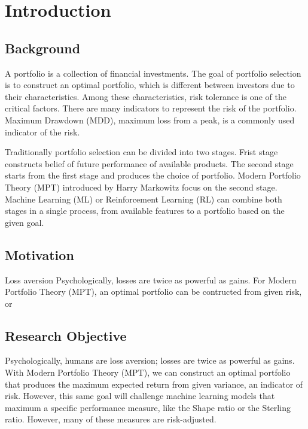 \chapter{Introduction}
\section {Background}
A portfolio is a collection of financial investments. The goal of portfolio selection is to construct an optimal portfolio, which is different between investors due to their characteristics. Among these characteristics, risk tolerance is one of the critical factors. There are many indicators to represent the risk of the portfolio. Maximum Drawdown (MDD),  maximum loss from a peak, is a commonly used indicator of the risk.

Traditionally portfolio selection can be divided into two stages. Frist stage constructs belief of future performance of available products. The second stage starts from the first stage and produces the choice of portfolio.  Modern Portfolio Theory (MPT) introduced by  Harry Markowitz \cite{10.2307/2975974} focus on the second stage. Machine Learning (ML) or Reinforcement Learning (RL) can combine both stages in a single process, from available features to a portfolio based on the given goal.
\section {Motivation}
Loss aversion Psychologically, losses are twice as powerful as gains. \cite{Tversky1992} For Modern Portfolio Theory (MPT), an optimal portfolio can be contructed from given risk, or  

\section {Research Objective}
Psychologically, humans are loss aversion; losses are twice as powerful as gains. \cite{Tversky1992} With Modern Portfolio Theory (MPT), we can construct an optimal portfolio that produces the maximum expected return from given variance, an indicator of risk. However, this same goal will challenge machine learning models that maximum a specific performance measure, like the Shape ratio or the Sterling ratio. However, many of these measures are risk-adjusted.
\label{c:intro}

